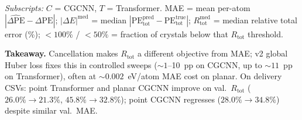 \documentclass[10pt,a4paper]{article}
\begin{document}
\noindent\textit{Subscripts:} $C$ = CGCNN, $T$ = Transformer.
MAE = mean per-atom $|\widehat{\Delta\mathrm{PE}}-\Delta\mathrm{PE}|$;
$|\Delta E|^{\mathrm{med}}$ = median $|\mathrm{PE}^{\mathrm{pred}}_{\mathrm{tot}}-\mathrm{PE}^{\mathrm{true}}_{\mathrm{tot}}|$;
$R_{\mathrm{tot}}^{\mathrm{med}}$ = median relative total error (\%);
$<100\%$ / $<50\%$ = fraction of crystals below that $R_{\mathrm{tot}}$ threshold.

\medskip
\noindent\textbf{Takeaway.}
Cancellation makes $R_{\mathrm{tot}}$ a different objective from MAE; v2 global Huber loss fixes this in controlled sweeps (${\sim}1$--10~pp on CGCNN, up to ${\sim}11$~pp on Transformer), often at ${\sim}0.002$~eV/atom MAE cost on planar.
On delivery CSVs: point Transformer and planar CGCNN improve on val.\ $R_{\mathrm{tot}}$ ($26.0\%\to 21.3\%$, $45.8\%\to 32.8\%$); point CGCNN regresses ($28.0\%\to 34.8\%$) despite similar val.\ MAE.
\end{document}

